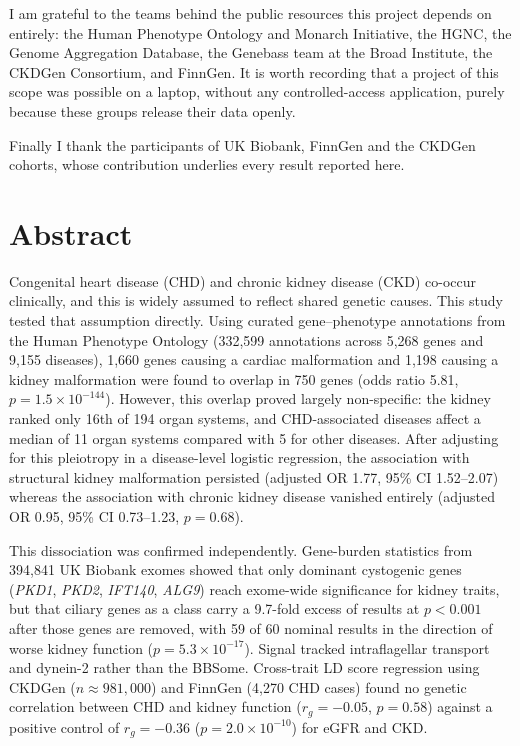 \documentclass[11pt,a4paper]{article}
\newcommand{\gene}[1]{\textit{#1}}
\begin{document}
I am grateful to the teams behind the public resources this project depends on entirely:
the Human Phenotype Ontology and Monarch Initiative, the HGNC, the Genome Aggregation
Database, the Genebass team at the Broad Institute, the CKDGen Consortium, and FinnGen. It
is worth recording that a project of this scope was possible on a laptop, without any
controlled-access application, purely because these groups release their data openly.

Finally I thank the participants of UK Biobank, FinnGen and the CKDGen cohorts, whose
contribution underlies every result reported here.

\newpage
\section*{Abstract}


Congenital heart disease (CHD) and chronic kidney disease (CKD) co-occur clinically, and
this is widely assumed to reflect shared genetic causes. This study tested that assumption
directly. Using curated gene--phenotype annotations from the Human Phenotype Ontology
(332,599 annotations across 5,268 genes and 9,155 diseases), 1,660 genes causing a cardiac
malformation and 1,198 causing a kidney malformation were found to overlap in 750 genes
(odds ratio 5.81, $p = 1.5 \times 10^{-144}$). However, this overlap proved largely
non-specific: the kidney ranked only 16th of 194 organ systems, and CHD-associated diseases
affect a median of 11 organ systems compared with 5 for other diseases. After adjusting for
this pleiotropy in a disease-level logistic regression, the association with structural
kidney malformation persisted (adjusted OR 1.77, 95\% CI 1.52--2.07) whereas the association
with chronic kidney disease vanished entirely (adjusted OR 0.95, 95\% CI 0.73--1.23,
$p = 0.68$).

This dissociation was confirmed independently. Gene-burden statistics from 394,841 UK Biobank
exomes showed that only dominant cystogenic genes (\gene{PKD1}, \gene{PKD2}, \gene{IFT140},
\gene{ALG9}) reach exome-wide significance for kidney traits, but that ciliary genes as a
class carry a 9.7-fold excess of results at $p < 0.001$ after those genes are removed, with
59 of 60 nominal results in the direction of worse kidney function ($p = 5.3 \times
10^{-17}$). Signal tracked intraflagellar transport and dynein-2 rather than the BBSome.
Cross-trait LD score regression using CKDGen ($n \approx 981{,}000$) and FinnGen
(4,270 CHD cases) found no genetic correlation between CHD and kidney function
($r_g = -0.05$, $p = 0.58$) against a positive control of $r_g = -0.36$
($p = 2.0 \times 10^{-10}$) for eGFR and CKD.
\end{document}
